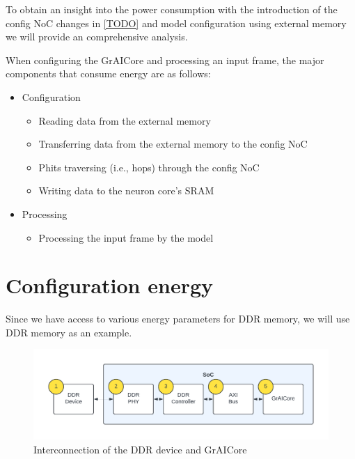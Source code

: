 To obtain an insight into the power consumption with the introduction of the config NoC changes in \cref{TODO} and model configuration using external memory we will provide an comprehensive analysis.

When configuring the GrAICore and processing an input frame, the major components that consume energy are as follows:
\begin{itemize}
    \item Configuration
    \begin{itemize}
        \item Reading data from the external memory
        \item Transferring data from the external memory to the config NoC
        \item Phits traversing (i.e., hops) through the config NoC
        \item Writing data to the neuron core's SRAM
    \end{itemize}
    \item Processing
    \begin{itemize}
        \item Processing the input frame by the model
    \end{itemize}
\end{itemize}

\section{Configuration energy}
Since we have access to various energy parameters for DDR memory, we will use DDR memory as an example.

\begin{figure}[hbtp]
    \centering
    \includegraphics[width=0.8\linewidth]{assets/ddr_graicore_block_diagram.pdf}
    \caption{
        Interconnection of the DDR device and GrAICore
    }
    \label{fig:ddr_graicore_block_diagram}
\end{figure}

